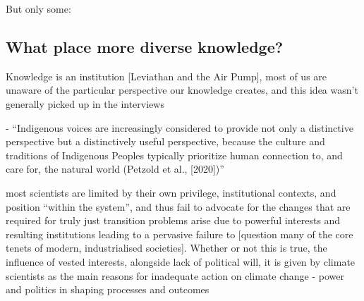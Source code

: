 But only some: 




\subsection{What place more diverse knowledge?}

Knowledge is an institution [Leviathan and the Air Pump], most of us are unaware of the particular perspective our knowledge creates, and this idea wasn't generally picked up in the interviews

\cite{Clayton2024} - ``Indigenous voices are increasingly considered to provide not only a distinctive perspective but a distinctively useful perspective, because the culture and traditions of Indigenous Peoples typically prioritize human connection to, and care for, the natural world (Petzold et al., [2020])''

\cite{Bendell2024} most scientists are limited by their own privilege, institutional contexts, and position ``within the system'', and thus fail to advocate for the changes that are required for truly just transition  
\cite{StoddardEtAl2021} problems arise due to powerful interests and resulting institutions leading to a pervasive failure to [question many of the core tenets of modern, industrialised societies]. Whether or not this is true, the influence of vested interests, alongside lack of political will, it is given by climate scientists as the main reasons for inadequate action on climate change \cite{Carrington2024} 
\cite{TurnhoutMWKL2020} - power and politics in shaping processes and outcomes

